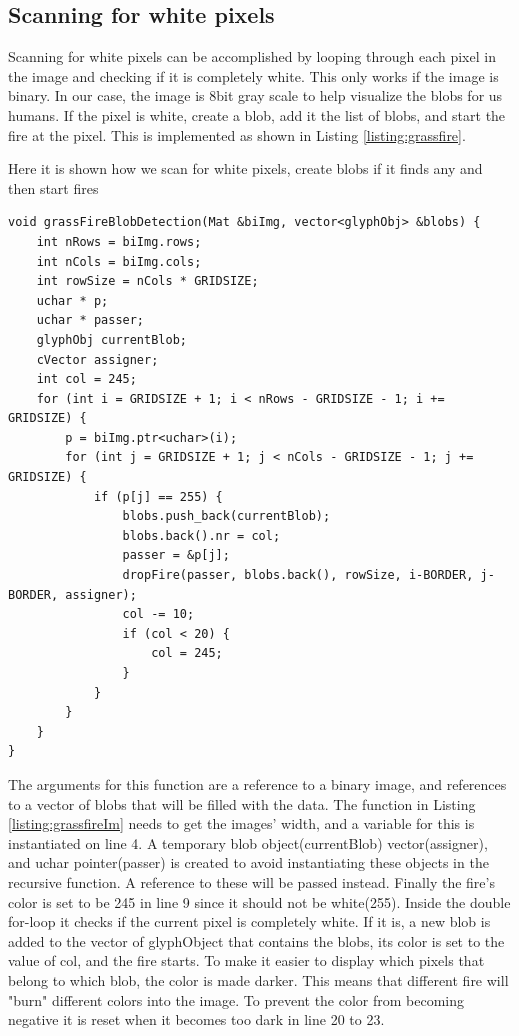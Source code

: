 \subsection{Scanning for white pixels}
Scanning for white pixels can be accomplished by looping through each pixel in the image and checking if it is completely white. This only works if the image is binary. In our case, the image is 8bit gray scale to help visualize the blobs for us humans. If the pixel is white, create a blob, add it the list of blobs, and start the fire at the pixel. This is implemented as shown in Listing \autoref{listing:grassfire}.
\begin{listing}[H]
	\caption{Here it is shown how we scan for white pixels, create blobs if it finds any and then start fires}
	\begin{verbatim}
void grassFireBlobDetection(Mat &biImg, vector<glyphObj> &blobs) {
	int nRows = biImg.rows;
	int nCols = biImg.cols;
	int rowSize = nCols * GRIDSIZE;
	uchar * p;
	uchar * passer;
	glyphObj currentBlob;
	cVector assigner;
	int col = 245;
	for (int i = GRIDSIZE + 1; i < nRows - GRIDSIZE - 1; i += GRIDSIZE) {
		p = biImg.ptr<uchar>(i);
		for (int j = GRIDSIZE + 1; j < nCols - GRIDSIZE - 1; j += GRIDSIZE) {
			if (p[j] == 255) {
				blobs.push_back(currentBlob);
				blobs.back().nr = col;
				passer = &p[j];
				dropFire(passer, blobs.back(), rowSize, i-BORDER, j-BORDER, assigner);
				col -= 10;
				if (col < 20) {
					col = 245;
				}
			}
		}
	}
}
	\end{verbatim}
	\label{listing:grassfire}
\end{listing}
The arguments for this function are a reference to a binary image, and references to a vector of blobs that will be filled with the data. The  function in Listing \ref{listing:grassfireIm} needs to get the images' width, and a variable for this is instantiated on line 4. A temporary blob object(currentBlob) vector(assigner), and uchar pointer(passer) is created to avoid instantiating these objects in the recursive function. A reference to these will be passed instead. Finally the fire's color is set to be 245 in line 9 since it should not be white(255). Inside the double for-loop it checks if the current pixel is completely white. If it is, a new blob is added to the vector of glyphObject that contains the blobs, its color is set to the value of col, and the fire starts. To make it easier to display which pixels that belong to which blob, the color is made darker. This means that different fire will "burn" different colors into the image. To prevent the color from becoming negative it is reset when it becomes too dark in line 20 to 23.\\
